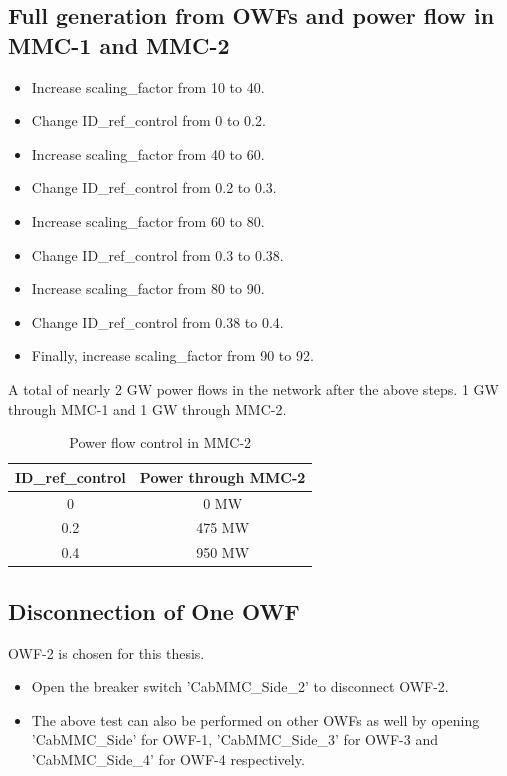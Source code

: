 \subsection{Full generation from OWFs and power flow in MMC-1 and MMC-2}\label{full_gen_appendix}
    \begin{itemize}
        \item Increase scaling\_factor from 10 to 40.
        \item Change ID\_ref\_control from 0 to 0.2.
        \item Increase scaling\_factor from 40 to 60.
        \item Change ID\_ref\_control from 0.2 to 0.3.
        \item Increase scaling\_factor from 60 to 80.
        \item Change ID\_ref\_control from 0.3 to 0.38.
        \item Increase scaling\_factor from 80 to 90.
        \item Change ID\_ref\_control from 0.38 to 0.4.
        \item Finally, increase scaling\_factor from 90 to 92.
    \end{itemize} 

A total of nearly 2 GW power flows in the network after the above steps. 1 GW through \gls{MMC}-1 and 1 GW through \gls{MMC}-2.


 \begin{table}[H]
 \centering
\begin{tabular}{|c|c|}
\hline
\textbf{ID\_ref\_control} & \textbf{Power through MMC-2} \\ \hline
0                    & 0 MW                         \\ \hline
0.2                  & 475 MW                       \\ \hline
0.4                  & 950 MW                       \\ \hline
\end{tabular}
\caption{Power flow control in MMC-2}
\label{tab:Power_flow_control_in_MMC-2}
\end{table}

\subsection{Disconnection of One OWF}
\gls{OWF}-2 is chosen for this thesis. 
\begin{itemize}
    \item Open the breaker switch 'CabMMC\_Side\_2' to disconnect \gls{OWF}-2.
    \item The above test can also be performed on other \gls{OWF}s as well by opening 'CabMMC\_Side' for \gls{OWF}-1, 'CabMMC\_Side\_3' for \gls{OWF}-3 and 'CabMMC\_Side\_4' for \gls{OWF}-4 respectively.
\end{itemize}

